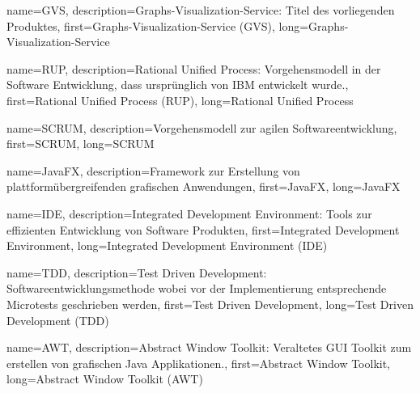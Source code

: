 



{
	name={GVS},
	description={Graphs-Visualization-Service: Titel des vorliegenden Produktes},
	first={Graphs-Visualization-Service (GVS)},
	long={Graphs-Visualization-Service}
}

{
	name={RUP},
	description={Rational Unified Process: Vorgehensmodell in der Software Entwicklung, dass ursprünglich von IBM entwickelt wurde.},
	first={Rational Unified Process (RUP)},
	long={Rational Unified Process}
}

{
	name={SCRUM},
	description={Vorgehensmodell zur agilen Softwareentwicklung},
	first={SCRUM},
	long={SCRUM}
}

{
	name={JavaFX},
	description={Framework zur Erstellung von plattformübergreifenden grafischen Anwendungen},
	first={JavaFX},
	long={JavaFX}
}

{
	name={IDE},
	description={Integrated Development Environment: Tools zur effizienten Entwicklung von Software Produkten},
	first={Integrated Development Environment},
	long={Integrated Development Environment (IDE)}
}

{
	name={TDD},
	description={Test Driven Development: Softwareentwicklungsmethode wobei vor der Implementierung entsprechende Microtests geschrieben werden},
	first={Test Driven Development},
	long={Test Driven Development (TDD)}
}

{
	name={AWT},
	description={Abstract Window Toolkit: Veraltetes GUI Toolkit zum erstellen von grafischen Java Applikationen.},
	first={Abstract Window Toolkit},
	long={Abstract Window Toolkit (AWT)}
}

